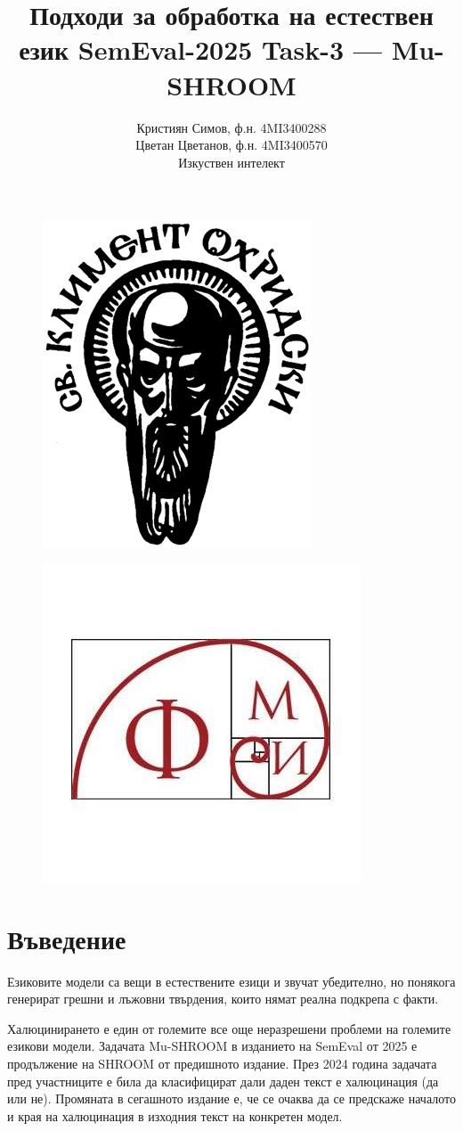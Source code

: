 \documentclass[12pt]{article}
\begin{document}
	
	\title{ Подходи за обработка на естествен език \newline SemEval-2025 Task-3 — Mu-SHROOM  \newline \hline}
	
	
	\author{Кристиян Симов, ф.н. 4MI3400288 \\ Цветан Цветанов, ф.н. 4MI3400570 \\ Изкуствен интелект}
	\maketitle
	
		\begin{figure}[H]
			\centering
			\includegraphics[width=0.25\linewidth]{clement-ohrid-logo.png}
		\end{figure}
		
		\begin{figure}[H]
			\centering
			\includegraphics[width=0.25\linewidth]{fmi-logo.jpg}
		\end{figure}
	
	
	\vspace{0.5in}
	\pagebreak
	
	\section{Въведение}
	
	Езиковите модели са вещи в естествените езици и звучат убедително, но понякога генерират грешни и лъжовни твърдения, които нямат реална подкрепа с факти. 

	Халюцинирането е един от големите все още неразрешени проблеми  на големите езикови модели.  Задачата  Mu-SHROOM в изданието на SemEval от 2025 е продължение на SHROOM от предишното издание. През 2024 година задачата пред участниците е била да класифицират дали даден текст е халюцинация (да или не). Промяната в сегашното издание е, че се очаква да се предскаже началото и края на халюцинация в изходния текст на конкретен модел.
	
\end{document}
